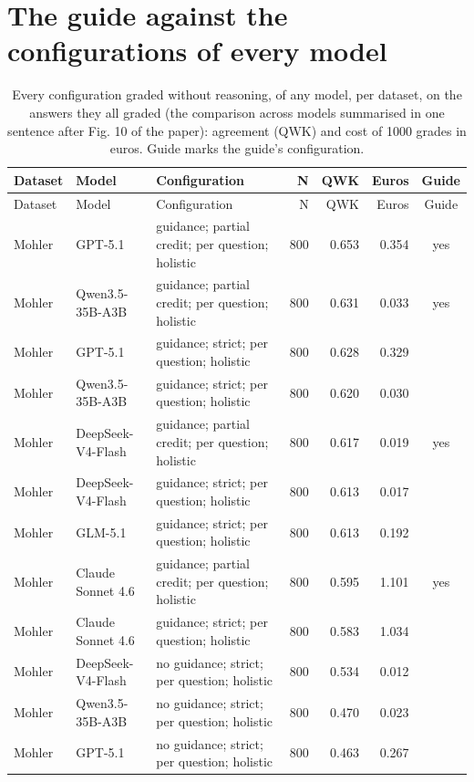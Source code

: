 \documentclass[10pt]{article}
\begin{document}
\section{The guide against the configurations of every model}
\begingroup\footnotesize
\begin{longtable}{ll>{\raggedright\arraybackslash}p{5.2cm}rrrc}
\caption{Every configuration graded without reasoning, of any model, per dataset, on the answers they all graded (the comparison across models summarised in one sentence after Fig. 10 of the paper): agreement (QWK) and cost of 1000 grades in euros. Guide marks the guide's configuration.}\\
\hline
Dataset & Model & Configuration & N & QWK & Euros & Guide \\ \hline
\endfirsthead
\hline
Dataset & Model & Configuration & N & QWK & Euros & Guide \\ \hline
\endhead
Mohler & GPT-5.1 & guidance; partial credit; per question; holistic & 800 & 0.653 & 0.354 & yes \\
Mohler & Qwen3.5-35B-A3B & guidance; partial credit; per question; holistic & 800 & 0.631 & 0.033 & yes \\
Mohler & GPT-5.1 & guidance; strict; per question; holistic & 800 & 0.628 & 0.329 &  \\
Mohler & Qwen3.5-35B-A3B & guidance; strict; per question; holistic & 800 & 0.620 & 0.030 &  \\
Mohler & DeepSeek-V4-Flash & guidance; partial credit; per question; holistic & 800 & 0.617 & 0.019 & yes \\
Mohler & DeepSeek-V4-Flash & guidance; strict; per question; holistic & 800 & 0.613 & 0.017 &  \\
Mohler & GLM-5.1 & guidance; strict; per question; holistic & 800 & 0.613 & 0.192 &  \\
Mohler & Claude Sonnet 4.6 & guidance; partial credit; per question; holistic & 800 & 0.595 & 1.101 & yes \\
Mohler & Claude Sonnet 4.6 & guidance; strict; per question; holistic & 800 & 0.583 & 1.034 &  \\
Mohler & DeepSeek-V4-Flash & no guidance; strict; per question; holistic & 800 & 0.534 & 0.012 &  \\
Mohler & Qwen3.5-35B-A3B & no guidance; strict; per question; holistic & 800 & 0.470 & 0.023 &  \\
Mohler & GPT-5.1 & no guidance; strict; per question; holistic & 800 & 0.463 & 0.267 &  \\

\end{longtable}
\end{document}
